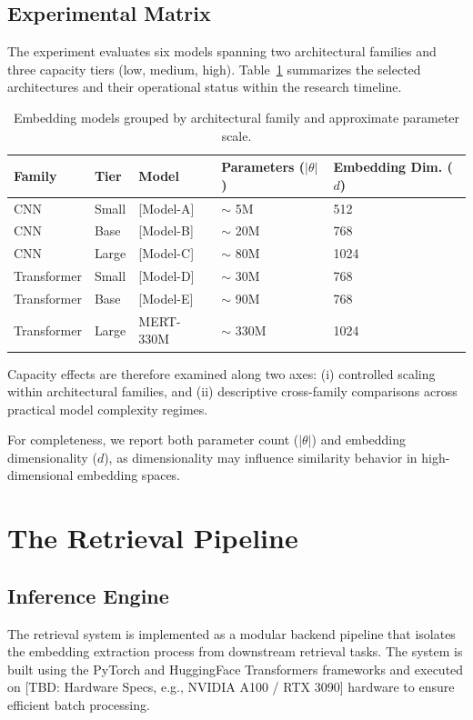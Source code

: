 \subsection{Experimental Matrix}
The experiment evaluates six models spanning two architectural families and three capacity tiers (low, medium, high). 
Table~\ref{tab:model_matrix} summarizes the selected architectures and their operational status within the research timeline.

\begin{table}[h]
\centering
\begin{tabular}{|l|l|l|l|l|}
\hline
Family & Tier & Model & Parameters ($|\theta|$) & Embedding Dim. ($d$) \\ \hline
CNN & Small & [Model-A] & $\sim$ 5M & 512 \\ \hline
CNN & Base & [Model-B] & $\sim$ 20M & 768 \\ \hline
CNN & Large & [Model-C] & $\sim$ 80M & 1024 \\ \hline
Transformer & Small & [Model-D] & $\sim$ 30M & 768 \\ \hline
Transformer & Base & [Model-E] & $\sim$ 90M & 768 \\ \hline
Transformer & Large & MERT-330M & $\sim$ 330M & 1024 \\ \hline
\end{tabular}
\caption{Embedding models grouped by architectural family and approximate parameter scale.}
\label{tab:model_matrix}
\end{table}


Capacity effects are therefore examined along two axes:
(i) controlled scaling within architectural families, and
(ii) descriptive cross-family comparisons across practical model complexity regimes.


For completeness, we report both parameter count ($|\theta|$) 
and embedding dimensionality ($d$), as dimensionality may influence 
similarity behavior in high-dimensional embedding spaces.



\section{The Retrieval Pipeline}

\subsection{Inference Engine}
The retrieval system is implemented as a modular backend pipeline that isolates the embedding extraction process from downstream retrieval tasks. The system is built using the PyTorch and HuggingFace Transformers frameworks and executed on [TBD: Hardware Specs, e.g., NVIDIA A100 / RTX 3090] hardware to ensure efficient batch processing.

